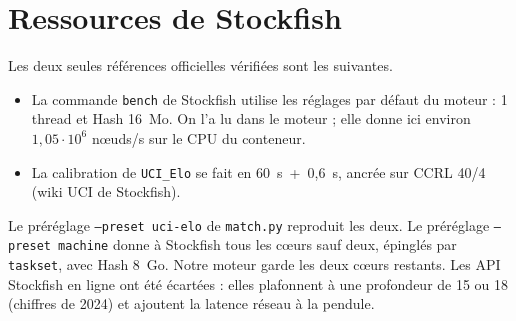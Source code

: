 \documentclass[11pt,a4paper]{article}
\newcommand{\code}[1]{\texttt{#1}}
\begin{document}
\section{Ressources de Stockfish}
Les deux seules références officielles vérifiées sont les suivantes.
\begin{itemize}
\item La commande \code{bench} de Stockfish utilise les réglages par défaut du moteur : 1 thread
et Hash 16~Mo. On l'a lu dans le moteur ; elle donne ici environ $1{,}05\cdot10^6$ nœuds/s sur le
CPU du conteneur.
\item La calibration de \code{UCI\_Elo} se fait en 60~s~+~0{,}6~s, ancrée sur CCRL 40/4 (wiki UCI
de Stockfish).
\end{itemize}
Le préréglage \code{--preset uci-elo} de \code{match.py} reproduit les deux. Le préréglage
\code{--preset machine} donne à Stockfish tous les cœurs sauf deux, épinglés par \code{taskset},
avec Hash 8~Go. Notre moteur garde les deux cœurs restants. Les API Stockfish en ligne ont été
écartées : elles plafonnent à une profondeur de 15 ou 18 (chiffres de 2024) et ajoutent la
latence réseau à la pendule.
\end{document}
